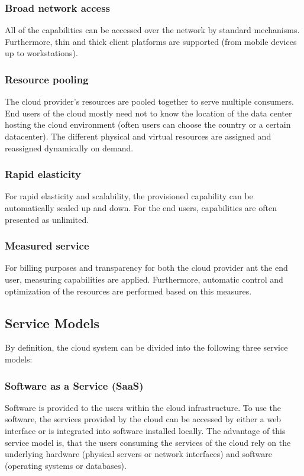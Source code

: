 \subsubsection{Broad network access}
All of the capabilities can be accessed over the network by standard mechanisms. Furthermore, thin and thick client platforms are supported (from mobile devices up to workstations).

\subsubsection{Resource pooling}
The cloud provider's resources are pooled together to serve multiple consumers. End users of the cloud mostly need not to know the location of the data center hosting the cloud environment (often users can choose the country or a certain datacenter). The different physical and virtual resources are assigned and reassigned dynamically on demand.

\subsubsection{Rapid elasticity}
For rapid elasticity and scalability, the provisioned capability can be automatically scaled up and down. For the end users, capabilities are often presented as unlimited.

\subsubsection{Measured service}
For billing purposes and transparency for both the cloud provider ant the end user, measuring capabilities are applied. Furthermore, automatic control and optimization of the resources are performed based on this measures.

\subsection{Service Models}
By definition, the cloud system can be divided into the following three service models\cite{nist}:

\subsubsection{Software as a Service (SaaS)}
Software is provided to the users within the cloud infrastructure. To use the software, the services provided by the cloud can be accessed by either a web interface or is integrated into software installed locally. The advantage of this service model is, that the users consuming the services of the cloud rely on the underlying hardware (physical servers or network interfaces) and software (operating systems or databases)\cite{nist}.
		
